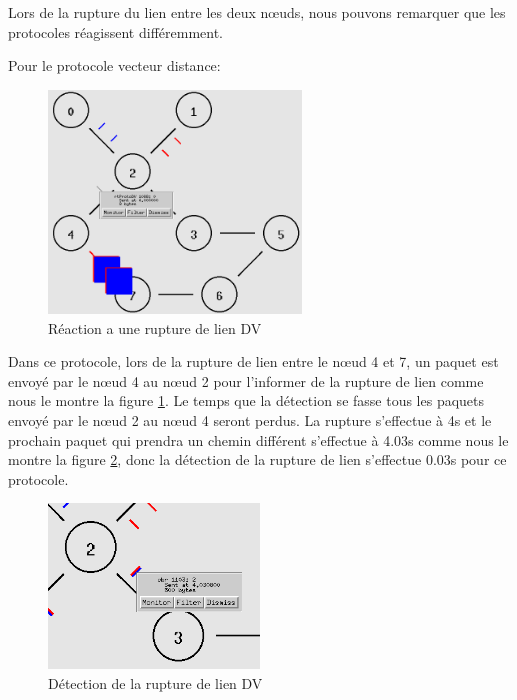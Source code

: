 \documentclass[11pt]{article}
\begin{document}
Lors de la rupture du lien entre les deux nœuds, nous pouvons remarquer que les protocoles
réagissent différemment.

Pour le protocole vecteur distance:

\begin{figure}[H]
	\begin{center}
		\includegraphics[width=0.6\textwidth]{assets/tp2/RutpureLienDV.png}
	\end{center}
	\caption{Réaction a une rupture de lien DV}
	\label{ruptureDV}
\end{figure}


Dans ce protocole, lors de la rupture de lien entre le nœud 4 et 7, un paquet est envoyé par le nœud 4 au nœud 2 pour l'informer de la rupture de lien comme nous le montre la figure \ref{ruptureDV}. Le temps que la détection se fasse tous les paquets envoyé par le nœud 2 au nœud 4 seront perdus. La rupture s’effectue à 4s et le prochain paquet qui prendra un chemin différent s'effectue à 4.03s comme nous le montre la figure \ref{detectRuptureDv}, donc la détection de la rupture de lien s’effectue 0.03s pour ce protocole.

\begin{figure}[H]
	\begin{center}
		\includegraphics[width=0.5\textwidth]{assets/tp2/detectionRuptureDV.png}
	\end{center}
	\caption{Détection de la rupture de lien DV}
	\label{detectRuptureDv}
\end{figure}
\end{document}
